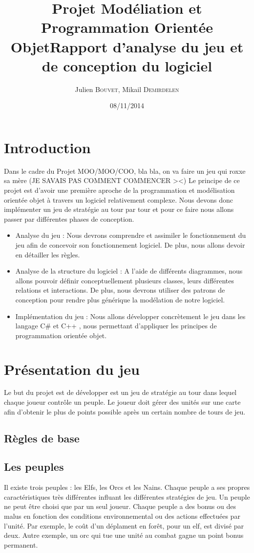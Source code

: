 \documentclass[12pt]{article}
\title{Projet Modéliation et Programmation Orientée Objet\smallbreak Rapport d'analyse du jeu et de conception du logiciel}
\author{Julien \textsc{Bouvet}, Mikail \textsc{Demirdelen} \\}
\date{08/11/2014}
\begin{document}
\maketitle
\newpage
\newpage
\tableofcontents
\newpage
\section{Introduction}

Dans le cadre du Projet MOO/MOO/COO, bla bla, on va faire un jeu qui roxxe sa mère (JE SAVAIS PAS COMMENT COMMENCER ><) \newline \newline
Le principe de ce projet est d'avoir une première aproche de la programmation et modélisation orientée objet à travers un logiciel relativement complexe. Nous devons donc implémenter un jeu de stratégie au tour par tour et pour ce faire nous allons passer par différentes phases de conception.
\begin{itemize}
  \item Analyse du jeu : Nous devrons comprendre et assimiler le fonctionnement du jeu afin de concevoir son fonctionnement logiciel. De plus, nous allons devoir en détailler les règles.
  \item Analyse de la structure du logiciel :  A l'aide de différents diagrammes, nous allons pouvoir définir conceptuellement plusieurs classes, leurs différentes relations et interactions. De plus, nous devrons utiliser des patrons de conception pour rendre plus générique la modélation de notre logiciel.
  \item Implémentation du jeu : Nous allons développer concrètement le jeu dans les langage C\# et C++ , nous permettant d'appliquer les principes de programmation orientée objet.
\end{itemize}
\newpage

\section{Présentation du jeu}
Le but du projet est de développer est un jeu de stratégie au tour dans lequel chaque joueur contrôle un peuple. Le joueur doit gérer des unités sur une carte afin d'obtenir le plus de points possible après un certain nombre de tours de jeu.
\subsection{Règles de base}
\subsection{Les peuples}
Il existe trois peuples : les Elfs, les Orcs et les Nains. Chaque peuple a ses propres caractéristiques très différentes influant les différentes stratégies de jeu. Un peuple ne peut être choisi que par un seul joueur.
Chaque peuple a des bonus ou des malus en fonction des conditions environnemental ou des actions effectuées par l'unité. Par exemple, le coût d'un déplament en forêt, pour un elf, est divisé par deux. Autre exemple, un orc qui tue une unité au combat gagne un point bonus permanent.
\end{document}
